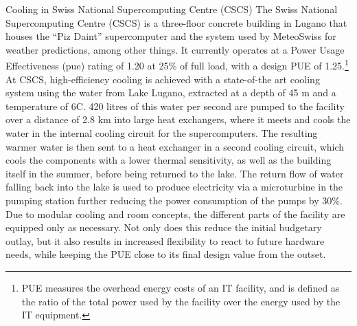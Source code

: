 \documentclass[../SustainableHEP.tex]{subfiles}
\begin{document}
\begin{bestpractice}{Cooling in Swiss National Supercomputing Centre (CSCS)}%
    The Swiss National Supercomputing Centre (CSCS) is a three-floor concrete building in Lugano that houses the “Piz Daint” supercomputer and the system used by MeteoSwiss for weather predictions, among other things.  It currently operates at a Power Usage Effectiveness (\acrshort{pue}) rating of 1.20 at 25\% of full load, with a design PUE of 1.25.\footnote{PUE measures the overhead energy costs of an IT facility, and is defined as the ratio of the total power used by the facility over the energy used by the IT equipment.}
    At CSCS, high-efficiency cooling is achieved with a state-of-the art cooling system using the water from Lake Lugano, extracted at a depth of 45 m 
    and a temperature of 6\degree C. 420 litres of this water per second are pumped to the facility over a distance of 2.8 km into large heat exchangers, where it meets and cools the water in the internal cooling circuit for the supercomputers. The resulting warmer water is then sent to a heat exchanger in a second cooling circuit, which cools the components with a lower thermal sensitivity, as well as the building itself in the summer, before being returned to the lake. The return flow of water falling back into the lake is used to produce electricity via a microturbine in the pumping station further reducing the power consumption of the pumps by 30\%.  Due to modular cooling and room concepts, the different parts of the facility are equipped only as necessary.  Not only does this reduce the initial budgetary outlay, but it also results in increased flexibility to react to future hardware needs, while keeping the PUE close to its final design value from the outset.
\end{bestpractice}
\end{document}
